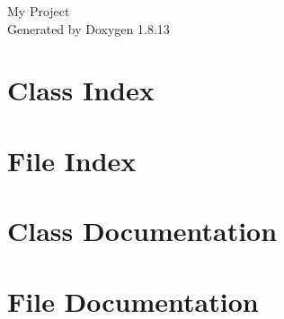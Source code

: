 \documentclass[twoside]{book}
\newcommand{\+}{\discretionary{\mbox{\scriptsize$\hookleftarrow$}}{}{}}
\newcommand{\clearemptydoublepage}{%
  \newpage{\pagestyle{empty}\cleardoublepage}%
}
\begin{document}
\hypersetup{pageanchor=false,
             bookmarksnumbered=true,
             pdfencoding=unicode
            }
\begin{titlepage}
\vspace*{7cm}
\begin{center}%
{\Large My Project }\\
\vspace*{1cm}
{\large Generated by Doxygen 1.8.13}\\
\end{center}
\end{titlepage}
\clearemptydoublepage
{}
\tableofcontents
\clearemptydoublepage
{}
\hypersetup{pageanchor=true}

\chapter{Class Index}

\chapter{File Index}

\chapter{Class Documentation}


\chapter{File Documentation}



\backmatter
\newpage
{}
\clearemptydoublepage
{}
\printindex
\end{document}
